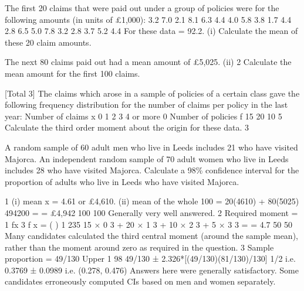 \documentclass[a4paper,12pt]{article}
\begin{document}
\begin{enumerate}
The first 20 claims that were paid out under a group of policies were for the following
amounts (in units of £1,000):
3.2
7.0
2.1
8.1
6.3
4.4
4.0
5.8
3.8
1.7
4.4
2.8
6.5
5.0
7.8
3.2
2.8
3.7
5.2
4.4
For these data \sumx = 92.2.
(i)
Calculate the mean of these 20 claim amounts.

The next 80 claims paid out had a mean amount of £5,025.
(ii)
2
Calculate the mean amount for the first 100 claims.

[Total 3]
The claims which arose in a sample of policies of a certain class gave the following
frequency distribution for the number of claims per policy in the last year:
Number of claims x 0 1 2 3 4 or more
0
Number of policies f 15 20 10 5
Calculate the third order moment about the origin for these data.
3

A random sample of 60 adult men who live in Leeds includes 21 who have visited Majorca. An independent random sample of 70 adult women who live in Leeds includes 28 who have visited Majorca.
Calculate a 98\% confidence interval for the proportion of adults who live in Leeds
who have visited Majorca.
\end{enumerate}
\newpage
1
(i) mean x = 4.61 or £4,610.
(ii) mean of the whole 100 =
20(4610) + 80(5025) 494200
=
= £4,942
100
100
Generally very well answered.
2
Required moment =
1
fx 3
\sum
\sum f
x
=
(
)
1
235
15 × 0 3 + 20 × 1 3 + 10 × 2 3 + 5 × 3 3 =
= 4.7
50
50
Many candidates calculated the third central moment (around the sample mean), rather than
the moment around zero as required in the question.
3
Sample proportion = 49/130
Upper 1%
98%
49/130 ± 2.326*[(49/130)(81/130)/130] 1/2 i.e. 0.3769 ± 0.0989 i.e. (0.278, 0.476)
Answers here were generally satisfactory. Some candidates erroneously computed CIs based
on men and women separately.
\end{document}
